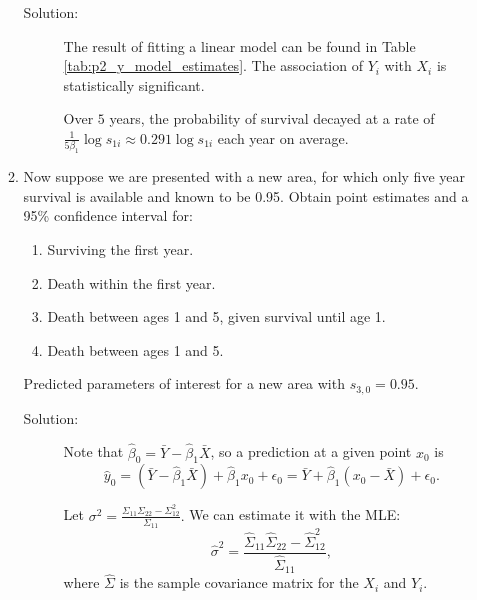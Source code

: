 \documentclass[letterpaper,11pt]{article}
\begin{document}
\begin{enumerate}
\begin{enumerate}
  \begin{description}
  \item[Solution:] The result of fitting a linear model can be found in Table
    \ref{tab:p2_y_model_estimates}. The association of $Y_{i}$ with $X_{i}$ is
    statistically significant.

    Over $5$ years, the probability of survival decayed at a rate of
    $\frac{1}{5\beta_1}\log s_{1i} \approx 0.291\log s_{1i}$ each year on
    average.
  \end{description}
\item Now suppose we are presented with a new area, for which only five year
  survival is available and known to be 0.95. Obtain point estimates and a
  95\% confidence interval for:
  \begin{enumerate}
  \item Surviving the first year.
  \item Death within the first year.
  \item Death between ages 1 and 5, given survival until age 1.
  \item Death between ages 1 and 5.
  \end{enumerate}

  \begin{table}
    \scriptsize
    \centering    
    
    \caption{Predicted parameters of interest for a new area with
      $s_{3,0} = 0.95$.}
    \label{tab:p2_parameters_of_interest}
  \end{table}
  
  \begin{description}
  \item[Solution:] Note that $\hat{\beta}_0 = \bar{Y} - \hat{\beta}_1\bar{X}$,
    so a prediction at a given point $x_0$ is
    \begin{equation}
      \hat{y}_0
      = \left(\bar{Y} - \hat{\beta}_1\bar{X}\right) + \hat{\beta}_1x_0 + \epsilon_0
      = \bar{Y} + \hat{\beta}_1\left(x_0 - \bar{X}\right)  + \epsilon_0.
      \label{eqn:p2_prediction}
    \end{equation}

        Let $\sigma^2 = \frac{\Sigma_{11}\Sigma_{22} - \Sigma_{12}^2}{\Sigma_{11}}.$
    We can estimate it with the MLE:
    \begin{equation}
      \hat{\sigma}^2 = \frac{\hat{\Sigma}_{11}\hat{\Sigma}_{22} - \hat{\Sigma}_{12}^2}
      {\hat{\Sigma}_{11}},
    \end{equation}
    where $\hat{\Sigma}$ is the sample covariance matrix for the $X_i$ and $Y_i$.


\end{description}
\end{enumerate}
\end{enumerate}
\end{document}
